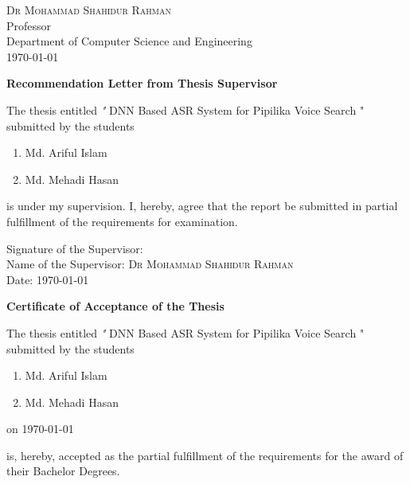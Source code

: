 \documentclass{standalone}
\begin{document}
\begin{titlepage}
\begin{center}
                \textsc{\large Dr Mohammad Shahidur Rahman}
\\
         Professor\\ 
				Department of Computer Science and Engineering\\
        \vfill
        \today
        \end{center}
				\newpage
				\begin{center}
					\textbf{\huge Recommendation Letter from Thesis Supervisor}
				\end{center}
				\noindent
				The thesis entitled \emph "{ DNN Based ASR System for Pipilika Voice Search }"
				\\
				submitted by the students
				\begin{enumerate}
					\item Md. Ariful Islam
					\item Md. Mehadi Hasan
				\end{enumerate}
				is under my supervision. I,
hereby, agree that the report be submitted in partial fulfillment of the requirements for examination.\\
                
				\vspace{2.0cm}

				\noindent
				Signature of the Supervisor: \\
				Name of the Supervisor: \textsc{\large Dr Mohammad Shahidur Rahman}\\%
				Date: \today
				\newpage
				\begin{center}
					\textbf{\huge Certificate of Acceptance of the Thesis}
				\end{center}
				
				\noindent
				The thesis entitled \emph"{ DNN Based ASR System for Pipilika Voice Search }"
				\\
				submitted by the students
				\begin{enumerate}
					\item Md. Ariful Islam
					\item Md. Mehadi Hasan
				\end{enumerate}
				on \today
				
				\noindent
				is, hereby, accepted as the partial fulfillment of the requirements for the award of their Bachelor Degrees.
				 \vspace{2.0cm}
				
				\begin{multicols}{3}
				

\end{multicols}
\end{titlepage}
\end{document}
